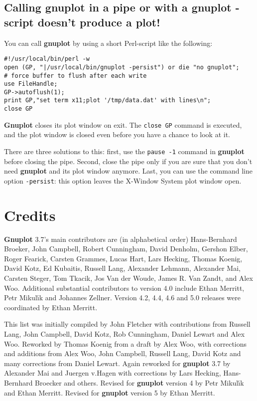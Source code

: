 \documentclass[a4paper,11pt]{article}
\newcommand{\gnuplot}{\textbf{gnuplot }}
\newcommand{\Gnuplot}{\textbf{Gnuplot }}
\begin{document}
\subsection{Calling \gnuplot in a pipe or with a \gnuplot-script
doesn't produce a plot!}

You can call \gnuplot by using a short Perl-script like the
following:
\small
\begin{verbatim}
#!/usr/local/bin/perl -w
open (GP, "|/usr/local/bin/gnuplot -persist") or die "no gnuplot";
# force buffer to flush after each write
use FileHandle;
GP->autoflush(1);
print GP,"set term x11;plot '/tmp/data.dat' with lines\n";
close GP
\end{verbatim}
\normalsize

\Gnuplot{} closes its plot window on exit. The \verb+close GP+
command is executed, and the plot window is closed even before you have
a chance to look at it.

There are three solutions to this: first, use the \verb+pause -1+
command in \gnuplot before closing the pipe. Second, close the pipe
only if you are sure that you don't need \gnuplot and its plot window
anymore. Last, you can use the command line option \verb+-persist+: this
option leaves the X-Window System plot window open.


\section{Credits}

\Gnuplot{} 3.7's main contributors are (in alphabetical order)
Hans-Bernhard Broeker, John Campbell, Robert Cunningham, David Denholm,
Gershon Elber, Roger Fearick, Carsten Grammes, Lucas Hart, Lars Hecking,
Thomas Koenig, David Kotz, Ed Kubaitis, Russell Lang, Alexander Lehmann,
Alexander Mai, Carsten Steger, Tom Tkacik, Jos Van der Woude, James R.
Van Zandt, and Alex Woo.  Additional substantial contributors to version 4.0
include Ethan Merritt, Petr Mikul\'{\i}k and Johannes Zellner.
Version 4.2, 4.4, 4.6 and 5.0 releases were coordinated by Ethan Merritt.

This list was initially compiled by John Fletcher with contributions
from Russell Lang, John Campbell, David Kotz, Rob Cunningham, Daniel
Lewart and Alex Woo. Reworked by Thomas Koenig from a draft
by Alex Woo, with corrections and additions from Alex Woo, John
Campbell, Russell Lang, David Kotz and many corrections from Daniel Lewart.
Again reworked for \gnuplot 3.7 by Alexander Mai and Juergen v.Hagen
with corrections by Lars Hecking, Hans-Bernhard Broecker and others.
Revised for \gnuplot version 4 by Petr Mikul\'{\i}k and Ethan Merritt.
Revised for \gnuplot version 5 by Ethan Merritt.
\end{document}
